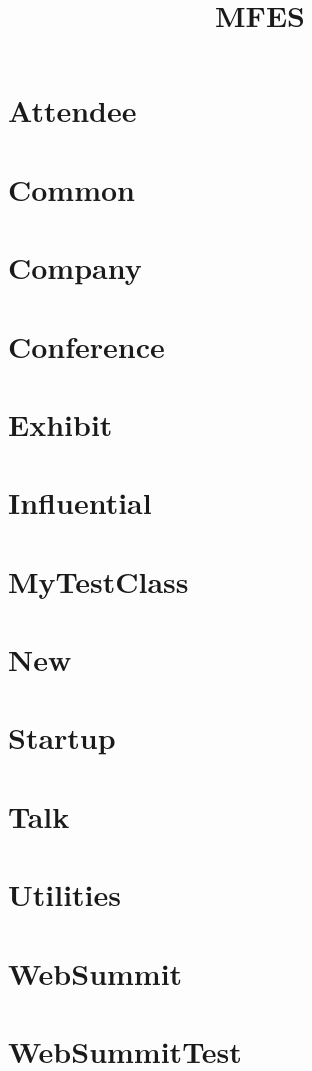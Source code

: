 \documentclass{article}
\begin{document}
\title{MFES}
\author{}
\maketitle
\tableofcontents

\section{Attendee}

\section{Common}

\section{Company}

\section{Conference}

\section{Exhibit}

\section{Influential}

\section{MyTestClass}

\section{New}

\section{Startup}

\section{Talk}

\section{Utilities}

\section{WebSummit}

\section{WebSummitTest}

\end{document}
